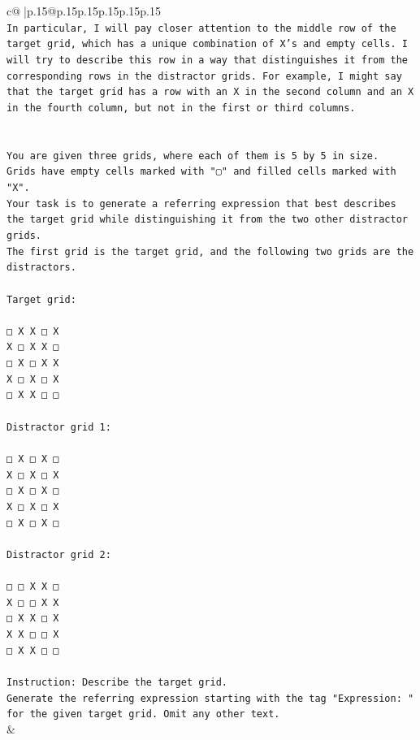 \documentclass{article}
\begin{document}
{\begin{supertabular}{c@{$\;$}|p{.15\linewidth}@{}p{.15\linewidth}p{.15\linewidth}p{.15\linewidth}p{.15\linewidth}p{.15\linewidth}}
{{{\\ 
\texttt{In particular, I will pay closer attention to the middle row of the target grid, which has a unique combination of X's and empty cells. I will try to describe this row in a way that distinguishes it from the corresponding rows in the distractor grids. For example, I might say that the target grid has a row with an X in the second column and an X in the fourth column, but not in the first or third columns.} \\
\\ 
\\ 
\texttt{You are given three grids, where each of them is 5 by 5 in size.} \\
\texttt{Grids have empty cells marked with "▢" and filled cells marked with "X".} \\
\texttt{Your task is to generate a referring expression that best describes the target grid while distinguishing it from the two other distractor grids.} \\
\texttt{The first grid is the target grid, and the following two grids are the distractors.} \\
\\ 
\texttt{Target grid:} \\
\\ 
\texttt{□ X X □ X} \\
\texttt{X □ X X □} \\
\texttt{□ X □ X X} \\
\texttt{X □ X □ X} \\
\texttt{□ X X □ □} \\
\\ 
\texttt{Distractor grid 1:} \\
\\ 
\texttt{□ X □ X □} \\
\texttt{X □ X □ X} \\
\texttt{□ X □ X □} \\
\texttt{X □ X □ X} \\
\texttt{□ X □ X □} \\
\\ 
\texttt{Distractor grid 2:} \\
\\ 
\texttt{□ □ X X □} \\
\texttt{X □ □ X X} \\
\texttt{□ X X □ X} \\
\texttt{X X □ □ X} \\
\texttt{□ X X □ □} \\
\\ 
\texttt{Instruction: Describe the target grid.} \\
\texttt{Generate the referring expression starting with the tag "Expression: " for the given target grid. Omit any other text.} \\
            }
        }
    }
    & \\ \\


\end{supertabular}}
\end{document}
